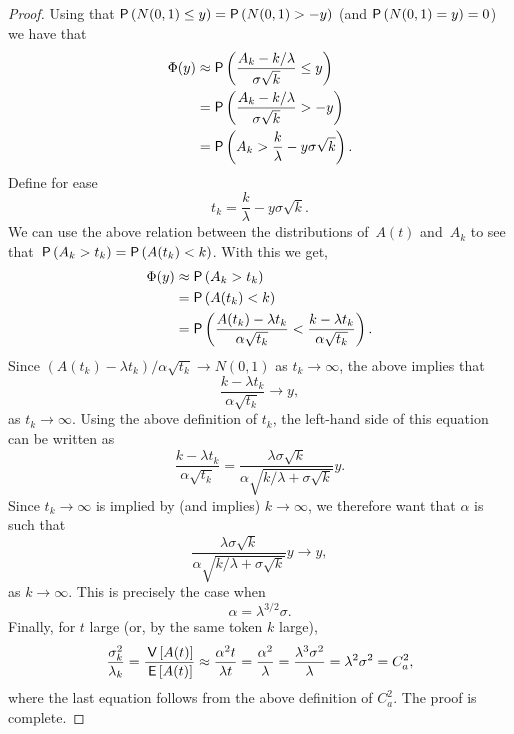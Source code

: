 \begin{proof}
Using that $\P{N(0,1) \leq y} =
\P{N(0,1) > -y}$ (and $\P{N(0,1)=y} = 0$) we have that
%
\begin{align*}
\Phi(y) &\approx \P{\frac{A_k - k/\lambda}{\sigma \sqrt k }\leq y} \\
 &= \P{\frac{A_k - k/\lambda}{\sigma \sqrt k} > -y} \\
 &= \P{A_k > \frac k\lambda - y \sigma \sqrt k}.
\end{align*}
Define for ease
\begin{equation*}
t_k = \frac{k}\lambda - y \sigma \sqrt k.
\end{equation*}
We can use the above relation between the distributions of~$A(t)$
and~$A_k$ to see that~$\P{A_k >t_k } = \P{A(t_k) <k}$. With this we
get,
\begin{align*}
\Phi(y)
 &\approx \P{A_k > t_k } \\
 &= \P{A(t_k) < k } \\
 &= \P{\frac{A(t_k) - \lambda t_k}{\alpha \sqrt{t_k}} < 
\frac{k-\lambda t_k}{\alpha \sqrt{t_k}}}.
\end{align*}
Since $(A(t_k) - \lambda t_k)/ \alpha \sqrt{t_k} \to N(0,1)$
as $t_k \to \infty$, the above implies that
\begin{equation*}
\frac{k-\lambda t_k}{\alpha \sqrt{t_k}} \to y,
\end{equation*}
as $t_k \to \infty$. Using the above definition of $t_k$, the left-hand side
of this equation can be written as
\begin{equation*}
\frac{k-\lambda t_k}{\alpha \sqrt{t_k}} =
\frac{\lambda \sigma \sqrt k }{\alpha \sqrt{k/\lambda + \sigma\sqrt k}} y.
\end{equation*}
Since $t_k \to \infty$ is implied by (and implies)
$k\to\infty$, we therefore want that $\alpha$ is such that
\begin{equation*}
\frac{\lambda \sigma \sqrt k }{\alpha \sqrt{k/\lambda + \sigma\sqrt k}} y \to y,
\end{equation*}
as $k\to\infty$. This is precisely the case when
\begin{equation*}
\alpha = \lambda^{3/2}\sigma.
\end{equation*}
Finally, for $t$ large (or, by the same token $k$ large),
\begin{equation*}
\frac{\sigma_k^2}{\lambda_k} = \frac{\,\mathsf{V}\left[A(t)\right]}{\,\mathsf{E}\left[A(t)\right]} \approx \frac{\alpha^2 t}{\lambda t} 
= \frac{\alpha^2}{\lambda} = \frac{\lambda^3\sigma^2}{\lambda} = \lambda^2 \sigma^2 = C_a^2,
\end{equation*}
where the last equation follows from the above definition of $C_a^2$.
The proof is complete.
\end{proof}








